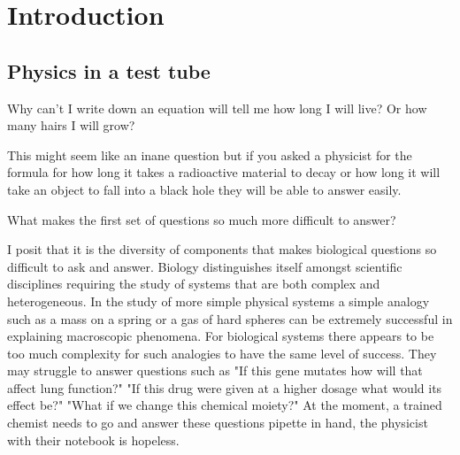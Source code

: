 \chapter{Introduction}
\setcounter{page}{1}
\label{chap:intro}
 {}

\section{Physics in a test tube}
\chapquote{}{}

\vskip 0.5cm

Why can't I  write down an equation will tell me how long I will live? Or how many hairs I will grow?

This might seem like an inane question but if you asked a physicist for the formula for how long it takes a radioactive material to decay or how long it will take an object to fall into a black hole they will be able to answer easily.

What makes the first set of questions so much more difficult to answer?

I posit that it is the diversity of components that makes biological questions so difficult to ask and answer. Biology distinguishes itself amongst scientific disciplines requiring the study of systems that are both complex and heterogeneous. In the study of more simple physical systems a simple analogy such as a mass on a spring or a gas of hard spheres can be extremely successful in explaining macroscopic phenomena. For biological systems there appears to be too much complexity for such analogies to have the same level of success. They may struggle to answer questions such as "If this gene mutates how will that affect lung function?" "If this drug were given at a higher dosage what would its effect be?" "What if we change this chemical moiety?" At the moment, a trained chemist needs to go and answer these questions pipette in hand, the physicist with their notebook is hopeless.

